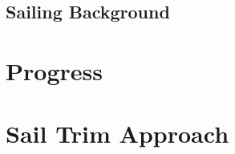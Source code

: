 \documentclass[12pt,twoside]{report}
\begin{document}
\section{Sailing Background}

\chapter{Progress}

\appendix
{}
\chapter{Sail Trim Approach}

\end{document}
